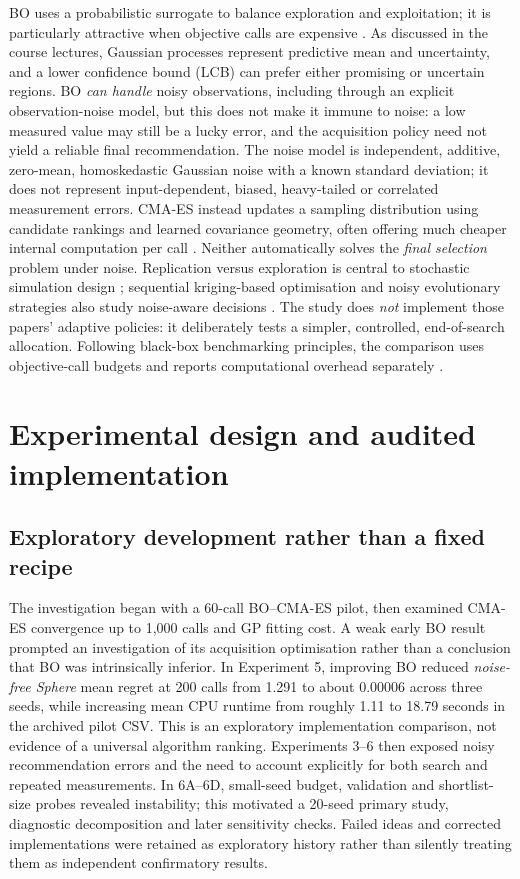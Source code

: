 \documentclass[11pt,a4paper]{article}
\begin{document}
BO uses a probabilistic surrogate to balance exploration and exploitation; it is particularly attractive when objective calls are expensive \citep{jones1998,shahriari2016,frazier2018}. As discussed in the course lectures, Gaussian processes represent predictive mean and uncertainty, and a lower confidence bound (LCB) can prefer either promising or uncertain regions. BO \emph{can handle} noisy observations, including through an explicit observation-noise model, but this does not make it immune to noise: a low measured value may still be a lucky error, and the acquisition policy need not yield a reliable final recommendation. The noise model is independent, additive, zero-mean, homoskedastic Gaussian noise with a known standard deviation; it does not represent input-dependent, biased, heavy-tailed or correlated measurement errors. CMA-ES instead updates a sampling distribution using candidate rankings and learned covariance geometry, often offering much cheaper internal computation per call \citep{hansen2016}. Neither automatically solves the \emph{final selection} problem under noise. Replication versus exploration is central to stochastic simulation design \citep{binois2019}; sequential kriging-based optimisation and noisy evolutionary strategies also study noise-aware decisions \citep{huang2006,dinu2024}. The study does \emph{not} implement those papers' adaptive policies: it deliberately tests a simpler, controlled, end-of-search allocation. Following black-box benchmarking principles, the comparison uses objective-call budgets and reports computational overhead separately \citep{coco2021}.

\section{Experimental design and audited implementation}
\subsection{Exploratory development rather than a fixed recipe}
The investigation began with a 60-call BO--CMA-ES pilot, then examined CMA-ES convergence up to 1,000 calls and GP fitting cost. A weak early BO result prompted an investigation of its acquisition optimisation rather than a conclusion that BO was intrinsically inferior. In Experiment 5, improving BO reduced \emph{noise-free Sphere} mean regret at 200 calls from 1.291 to about 0.00006 across three seeds, while increasing mean CPU runtime from roughly 1.11 to 18.79 seconds in the archived pilot CSV. This is an exploratory implementation comparison, not evidence of a universal algorithm ranking. Experiments 3--6 then exposed noisy recommendation errors and the need to account explicitly for both search and repeated measurements. In 6A--6D, small-seed budget, validation and shortlist-size probes revealed instability; this motivated a 20-seed primary study, diagnostic decomposition and later sensitivity checks. Failed ideas and corrected implementations were retained as exploratory history rather than silently treating them as independent confirmatory results.
\end{document}
